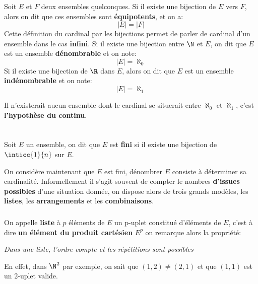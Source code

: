 \subsection*{}

Soit \(E\) et \(F\) deux ensembles quelconques.\+
Si il existe une bijection de \(E\) vers \(F\), alors on dit que ces ensembles sont \textbf{équipotents}, et on a:
\[
    |E| = |F|
\]
Cette définition du cardinal par les bijections permet de parler de cardinal d'un ensemble dans le cas \textbf{infini}.\+
Si il existe une bijection entre \(\N\) et \(E\), on dit que \(E\) est un ensemble \textbf{dénombrable} et on note:
\[
    |E| = \aleph_0
\]
Si il existe une bijection de \(\R\) dans \(E\), alors on dit que \(E\) est un ensemble \textbf{indénombrable} et on note:
\[
    |E| = \aleph_1
\]

Il n'existerait aucun ensemble dont le cardinal se situerait entre \(\aleph_0\) et \(\aleph_1\), c'est \textbf{l'hypothèse du continu}.
\chapter*{} %

Soit \(E\) un ensemble, on dit que \(E\) est \textbf{fini} si il existe une bijection de \(\inticc{1}{n}\) sur \(E\).\<

On considère maintenant que \(E\) est fini, dénombrer \(E\) consiste à déterminer sa cardinalité. Informellement il s'agit souvent de compter le nombres \textbf{d'issues possibles} d'une situation donnée, on dispose alors de trois grands modèles, les \textbf{listes}, les \textbf{arrangements} et les \textbf{combinaisons}.

\subsection*{}
On appelle \textbf{liste} à \(p\) éléments de \(E\) un p-uplet constitué d'éléments de \(E\), c'est à dire \textbf{un élément du produit cartésien} \(E^p\) on remarque alors la propriété:
\begin{center}
   \textit{
      Dans une liste, l'ordre compte et les répétitions sont possibles
   }
\end{center}
En effet, dans \(\N^2\) par exemple, on sait que \((1, 2) \neq (2, 1)\) et que \((1, 1)\) est un 2-uplet valide.\<

